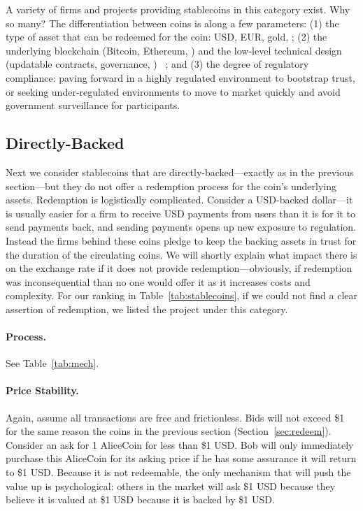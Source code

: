 A variety of firms and projects providing stablecoins in this category exist. Why so many? The differentiation between coins is along a few parameters: (1) the type of asset that can be redeemed for the coin: USD, EUR, gold, \etc; (2) the underlying blockchain (\eg Bitcoin, Ethereum, \etc) and the low-level technical design (updatable contracts, governance, \etc) ~\cite{geminido29:online}; and (3) the degree of regulatory compliance: paving forward in a highly regulated environment to bootstrap trust, or seeking under-regulated environments to move to market quickly and avoid government surveillance for participants.


\subsection{Directly-Backed}
\label{sec:tether}

Next we consider stablecoins that are directly-backed---exactly as in the previous section---but they do not offer a redemption process for the coin's underlying assets. Redemption is logistically complicated. Consider a USD-backed dollar---it is usually easier for a firm to receive USD payments from users than it is for it to send payments back, and sending payments opens up new exposure to regulation. Instead the firms behind these coins  pledge to keep the backing assets in trust for the duration of the circulating coins. We will shortly explain what impact there is on the exchange rate if it does not provide redemption---obviously, if redemption was inconsequential than no one would offer it as it increases costs and complexity. For our ranking in Table~\ref{tab:stablecoins}, if we could not find a clear assertion of redemption, we listed the project under this category.

\paragraph{Process.} See Table~\ref{tab:mech}.

\paragraph{Price Stability.} Again, assume all transactions are free and frictionless. Bids will not exceed \$1 for the same reason the coins in the previous section (Section~\ref{sec:redeem}). Consider an ask for 1 AliceCoin for less than \$1 USD. Bob will only immediately purchase this AliceCoin for its asking price if he has some assurance it will return to \$1 USD. Because it is not redeemable, the only mechanism that will push the value up is psychological: others in the market will ask \$1 USD because they believe it is valued at \$1 USD because it is backed by \$1 USD.

